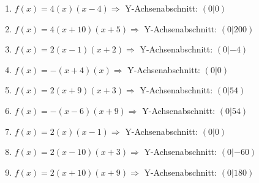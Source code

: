 \documentclass{article}%
\begin{document}
\begin{enumerate}[label=\alph*)]
\item%
\newline\vspace{0.5cm}$f(x)=4(x)(x-4) \Rightarrow $ Y-Achsenabschnitt: $ (0|0) $%
\item%
\newline\vspace{0.5cm}$f(x)=4(x+10)(x+5) \Rightarrow $ Y-Achsenabschnitt: $ (0|200) $%
\item%
\newline\vspace{0.5cm}$f(x)=2(x-1)(x+2) \Rightarrow $ Y-Achsenabschnitt: $ (0|-4) $%
\item%
\newline\vspace{0.5cm}$f(x)=-(x+4)(x) \Rightarrow $ Y-Achsenabschnitt: $ (0|0) $%
\item%
\newline\vspace{0.5cm}$f(x)=2(x+9)(x+3) \Rightarrow $ Y-Achsenabschnitt: $ (0|54) $%
\item%
\newline\vspace{0.5cm}$f(x)=-(x-6)(x+9) \Rightarrow $ Y-Achsenabschnitt: $ (0|54) $%
\item%
\newline\vspace{0.5cm}$f(x)=2(x)(x-1) \Rightarrow $ Y-Achsenabschnitt: $ (0|0) $%
\item%
\newline\vspace{0.5cm}$f(x)=2(x-10)(x+3) \Rightarrow $ Y-Achsenabschnitt: $ (0|-60) $%
\item%
\newline\vspace{0.5cm}$f(x)=2(x+10)(x+9) \Rightarrow $ Y-Achsenabschnitt: $ (0|180) $%
\end{enumerate}

%
\end{document}
